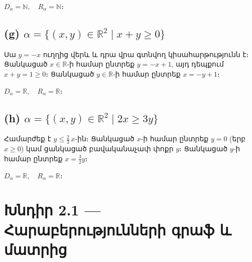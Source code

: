 \documentclass[12pt, a4paper]{article}
\newcommand{\R}{\mathbb{R}}
\newcommand{\N}{\mathbb{N}}
\begin{document}
\begin{answerbox}
$D_\alpha = \N, \quad R_\alpha = \N։$
\end{answerbox}

\subsection*{(g)\; $\alpha = \{(x,y) \in \R^2 \mid x + y \ge 0\}$}

Սա $y = -x$ ուղղից վերև և դրա վրա գտնվող կիսահարթությունն է։
Ցանկացած $x \in \R$-ի համար ընտրեք $y = -x + 1$, այդ դեպքում $x + y = 1 \ge 0$։
Ցանկացած $y \in \R$-ի համար ընտրեք $x = -y + 1$։

\begin{answerbox}
$D_\alpha = \R, \quad R_\alpha = \R։$
\end{answerbox}

\begin{center}
\end{center}

\subsection*{(h)\; $\alpha = \{(x,y) \in \R^2 \mid 2x \ge 3y\}$}

Համարժեք է $y \le \tfrac{2}{3}\,x$-ին։
Ցանկացած $x$-ի համար ընտրեք $y = 0$ (երբ $x \ge 0$) կամ ցանկացած բավականաչափ փոքր $y$։
Ցանկացած $y$-ի համար ընտրեք $x = \tfrac{3}{2}y$։

\begin{answerbox}
$D_\alpha = \R, \quad R_\alpha = \R։$
\end{answerbox}

\newpage
\section{Խնդիր 2.1 — Հարաբերությունների գրաֆ և մատրից}
\end{document}
